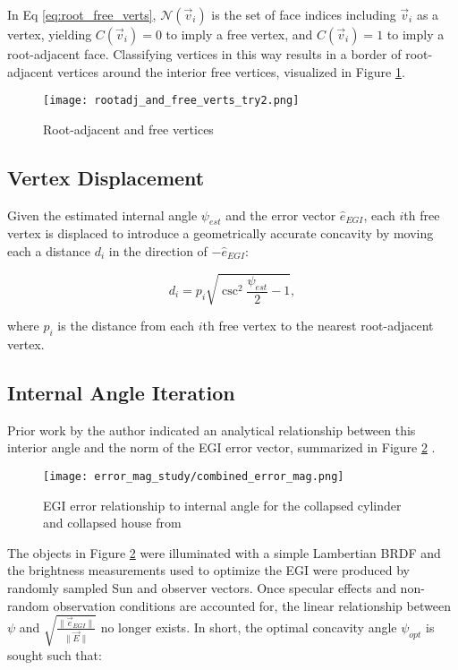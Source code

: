 In Eq \ref{eq:root_free_verts}, $\mathcal{N}(\vec{v}_i)$ is the set of face indices including $\vec{v}_i$ as a vertex, yielding $C(\vec{v}_i) = 0$ to imply a free vertex, and $C(\vec{v}_i) = 1$ to imply a root-adjacent face. Classifying vertices in this way results in a border of root-adjacent vertices around the interior free vertices, visualized in Figure \ref{fig:root_and_free}.

\begin{figure}[!htb]
  \centering
  \texttt{[image: rootadj\_and\_free\_verts\_try2.png]}
  \caption{Root-adjacent and free vertices}
  \label{fig:root_and_free}
\end{figure}

\subsection{Vertex Displacement}

Given the estimated internal angle $\psi_{est}$ and the error vector $\hat{e}_{EGI}$, each $i$th free vertex is displaced to introduce a geometrically accurate concavity by moving each a distance $d_i$ in the direction of $-\hat{e}_{EGI}$:

\begin{equation} \label{eq:flip_depth}
  d_i = p_i \sqrt{\csc^2 \frac{\psi_{est}}{2} - 1},
\end{equation}

where $p_i$ is the distance from each $i$th free vertex to the nearest root-adjacent vertex.

\subsection{Internal Angle Iteration}

Prior work by the author indicated an analytical relationship between this interior angle and the norm of the EGI error vector, summarized in Figure \ref{fig:misleading_egi_error} \cite{robinson2022}.

\begin{figure}[!htb]
  \centering
  \texttt{[image: error\_mag\_study/combined\_error\_mag.png]}
  \caption{EGI error relationship to internal angle for the collapsed cylinder and collapsed house from \cite{robinson2022}}
  \label{fig:misleading_egi_error}
\end{figure}

The objects in Figure \ref{fig:misleading_egi_error} were illuminated with a simple Lambertian BRDF and the brightness measurements used to optimize the EGI were produced by randomly sampled Sun and observer vectors. Once specular effects and non-random observation conditions are accounted for, the linear relationship between $\psi$ and $\sqrt{\frac{\|\vec{e}_{EGI}\|}{\|\vec{E}\|}}$ no longer exists. In short, the optimal concavity angle $\psi_{opt}$ is sought such that:

